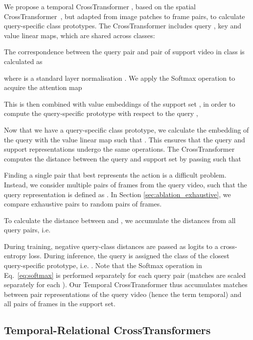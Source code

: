 \documentclass[final]{cvpr}
\begin{document}
We propose a temporal CrossTransformer , based on the spatial CrossTransformer~\cite{Doersch2020},  but adapted from image patches to frame pairs, to calculate query-specific class prototypes. 
The CrossTransformer includes query , key  and value  linear maps, which are shared across classes:
\vspace{-2pt}

The correspondence between the query pair and pair  of support video  in class  is calculated as 
\vspace{-2pt}

where  is a standard layer normalisation \cite{Ba2016}.
We apply the Softmax operation to acquire the attention map 
\vspace{-5pt}

This is then combined with value embeddings of the support set , in order to compute the query-specific prototype with respect to the query ,  
\vspace{-1pt}

Now that we have a query-specific class prototype, we calculate the embedding of the query  with the value linear map such that .  This ensures that the query and support representations undergo the same operations.
The CrossTransformer  computes the distance between the query and support set  by passing  such that
\vspace{-1pt}


Finding a single pair that best represents the action  is a difficult problem. Instead, we consider multiple pairs of frames from the query video, such that the query representation is defined as . 
 In Section \ref{sec:ablation_exhaustive}, we compare exhaustive pairs to random pairs of frames.

To calculate the distance between  and , we accumulate the distances from all query pairs, i.e.

During training, negative query-class distances  are passed as logits to a cross-entropy loss.  During inference, the query  is assigned the class of the closest query-specific prototype, i.e. .
Note that the Softmax operation in Eq.~\ref{eq:softmax} is performed separately for each query pair  (\ie matches are scaled separately for each ). 
Our Temporal CrossTransformer thus accumulates matches between  pair representations of the query video (hence the term temporal) and all pairs of frames in the support set.  

\subsection{Temporal-Relational CrossTransformers}\label{sec:multiple_card}
\end{document}
